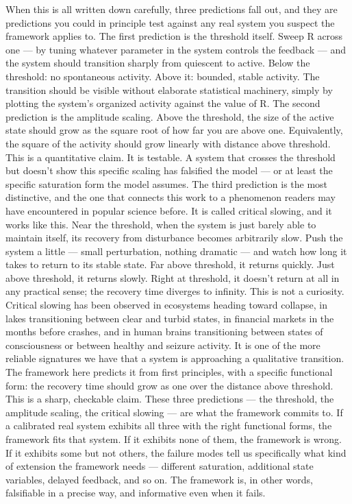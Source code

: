 \documentclass[12pt]{article}
\begin{document}
When this is all written down carefully, three predictions fall out, and they are predictions you could in principle test against any real system you suspect the framework applies to. The first prediction is the threshold itself. Sweep R across one --- by tuning whatever parameter in the system controls the feedback --- and the system should transition sharply from quiescent to active. Below the threshold: no spontaneous activity. Above it: bounded, stable activity. The transition should be visible without elaborate statistical machinery, simply by plotting the system's organized activity against the value of R. The second prediction is the amplitude scaling. Above the threshold, the size of the active state should grow as the square root of how far you are above one. Equivalently, the square of the activity should grow linearly with distance above threshold. This is a quantitative claim. It is testable. A system that crosses the threshold but doesn't show this specific scaling has falsified the model --- or at least the specific saturation form the model assumes. The third prediction is the most distinctive, and the one that connects this work to a phenomenon readers may have encountered in popular science before. It is called critical slowing, and it works like this. Near the threshold, when the system is just barely able to maintain itself, its recovery from disturbance becomes arbitrarily slow. Push the system a little --- small perturbation, nothing dramatic --- and watch how long it takes to return to its stable state. Far above threshold, it returns quickly. Just above threshold, it returns slowly. Right at threshold, it doesn't return at all in any practical sense; the recovery time diverges to infinity. This is not a curiosity. Critical slowing has been observed in ecosystems heading toward collapse, in lakes transitioning between clear and turbid states, in financial markets in the months before crashes, and in human brains transitioning between states of consciousness or between healthy and seizure activity. It is one of the more reliable signatures we have that a system is approaching a qualitative transition. The framework here predicts it from first principles, with a specific functional form: the recovery time should grow as one over the distance above threshold. This is a sharp, checkable claim. These three predictions --- the threshold, the amplitude scaling, the critical slowing --- are what the framework commits to. If a calibrated real system exhibits all three with the right functional forms, the framework fits that system. If it exhibits none of them, the framework is wrong. If it exhibits some but not others, the failure modes tell us specifically what kind of extension the framework needs --- different saturation, additional state variables, delayed feedback, and so on. The framework is, in other words, falsifiable in a precise way, and informative even when it fails.
\end{document}
